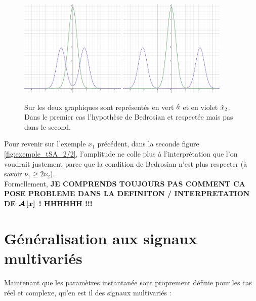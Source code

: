 \begin{figure}[h]\centering
	\includegraphics[width=0.45\textwidth]{fig/bedro condi 1.png} 
	\hfill
	\includegraphics[width=0.45\textwidth]{fig/bedro condi 2.png} 
	\caption{Sur les deux graphiques sont représentés en vert $\hat{a}$ et en violet $\hat{x}_2$. Dans le premier cas l'hypothèse de Bedrosian et respectée mais pas dans le second.}
	\label{fig:alising-ish}
\end{figure}


Pour revenir sur l'exemple $x_1$ précédent, dans la seconde figure \ref{fig:exemple_tSA_2/2}, l'amplitude ne colle plus à l'interprétation que l'on voudrait justement parce que la condition de Bedrosian n'est plus respecter (à savoir $\nu_1\geq 2\nu_2$). 
\\
Formellement, \textbf{JE COMPRENDS TOUJOURS PAS COMMENT CA POSE PROBLEME DANS LA DEFINITON / INTERPRETATION DE $\boldsymbol{\mathcal{A}\left[x\right]}$ ! HHHHHH !!!}
\\



\section{Généralisation aux signaux multivariés}\label{sec:sign_multivar}

Maintenant que les paramètres instantanée sont proprement définie pour les cas réel et complexe, qu'en est il des signaux multivariés :

